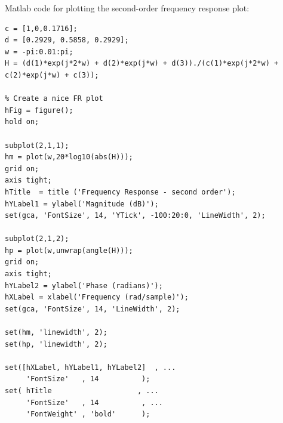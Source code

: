 \newpage
Matlab code for plotting the second-order frequency response plot:
\begin{verbatim}
c = [1,0,0.1716];
d = [0.2929, 0.5858, 0.2929];
w = -pi:0.01:pi;
H = (d(1)*exp(j*2*w) + d(2)*exp(j*w) + d(3))./(c(1)*exp(j*2*w) + c(2)*exp(j*w) + c(3));

% Create a nice FR plot 
hFig = figure();
hold on;

subplot(2,1,1);
hm = plot(w,20*log10(abs(H)));
grid on;
axis tight;
hTitle  = title ('Frequency Response - second order');
hYLabel1 = ylabel('Magnitude (dB)');
set(gca, 'FontSize', 14, 'YTick', -100:20:0, 'LineWidth', 2);

subplot(2,1,2);
hp = plot(w,unwrap(angle(H)));
grid on;
axis tight;
hYLabel2 = ylabel('Phase (radians)');
hXLabel = xlabel('Frequency (rad/sample)');
set(gca, 'FontSize', 14, 'LineWidth', 2);

set(hm, 'linewidth', 2);
set(hp, 'linewidth', 2);

set([hXLabel, hYLabel1, hYLabel2]  , ...
     'FontSize'   , 14          );
set( hTitle                    , ...
     'FontSize'   , 14          , ...
     'FontWeight' , 'bold'      );
\end{verbatim}
